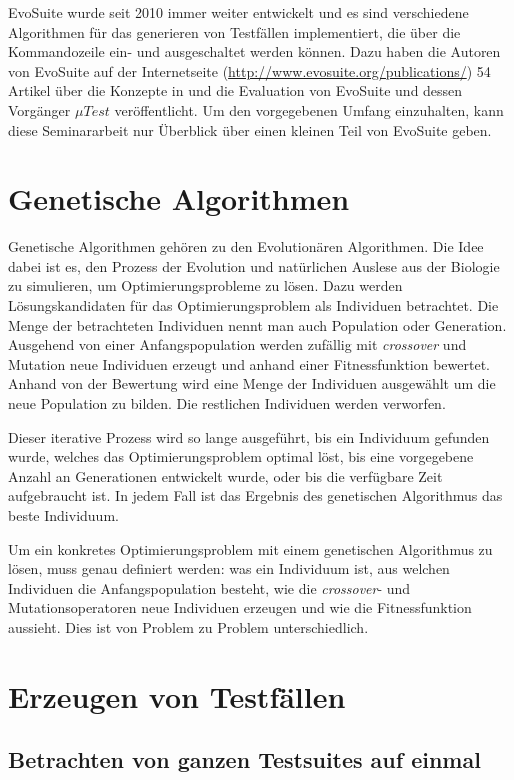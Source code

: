 \documentclass[a4paper,11pt]{article}
\begin{document}
EvoSuite wurde seit 2010 immer weiter entwickelt und es sind verschiedene Algorithmen für das generieren von Testfällen implementiert, die über die Kommandozeile ein- und ausgeschaltet werden können.
Dazu haben die Autoren von EvoSuite auf der Internetseite (\url{http://www.evosuite.org/publications/}) 54 Artikel über die Konzepte in und die Evaluation von EvoSuite und dessen Vorgänger ${\mu}Test$ veröffentlicht.
Um den vorgegebenen Umfang einzuhalten, kann diese Seminararbeit nur Überblick über einen kleinen Teil von EvoSuite geben.

\section{Genetische Algorithmen}
\label{sec:gen_alg}

Genetische Algorithmen gehören zu den Evolutionären Algorithmen.
Die Idee dabei ist es, den Prozess der Evolution und natürlichen Auslese aus der Biologie zu simulieren, um Optimierungsprobleme zu lösen.
Dazu werden Lösungskandidaten für das Optimierungsproblem als Individuen betrachtet.
Die Menge der betrachteten Individuen nennt man auch Population oder Generation.
Ausgehend von einer Anfangspopulation werden zufällig mit \textit{crossover} und Mutation neue Individuen erzeugt und anhand einer Fitnessfunktion bewertet.
Anhand von der Bewertung wird eine Menge der Individuen ausgewählt um die neue Population zu bilden.
Die restlichen Individuen werden verworfen.

Dieser iterative Prozess wird so lange ausgeführt, bis ein Individuum gefunden wurde, welches das Optimierungsproblem optimal löst, bis eine vorgegebene Anzahl an Generationen entwickelt wurde, oder bis die verfügbare Zeit aufgebraucht ist.
In jedem Fall ist das Ergebnis des genetischen Algorithmus das beste Individuum.

Um ein konkretes Optimierungsproblem mit einem genetischen Algorithmus zu lösen, muss genau definiert werden: was ein Individuum ist, aus welchen Individuen die Anfangspopulation besteht, wie die \textit{crossover}- und Mutationsoperatoren neue Individuen erzeugen und wie die Fitnessfunktion aussieht.
Dies ist von Problem zu Problem unterschiedlich.

\section{Erzeugen von Testfällen}

\subsection{Betrachten von ganzen Testsuites auf einmal}
\end{document}
